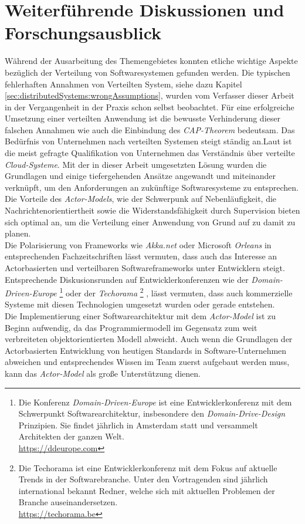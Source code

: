 \section{Weiterführende Diskussionen und Forschungsausblick}
Während der Ausarbeitung des Themengebietes konnten etliche wichtige Aspekte bezüglich der Verteilung von Softwaresystemen gefunden werden. Die typischen fehlerhaften Annahmen von Verteilten System, siehe dazu Kapitel \ref{sec:distributedSystems:wrongAssumptions}, wurden vom Verfasser dieser Arbeit in der Vergangenheit in der Praxis schon selbst beobachtet. Für eine erfolgreiche Umsetzung einer verteilten Anwendung ist  die bewusste 
Verhinderung dieser falschen Annahmen wie auch die Einbindung des \textit{CAP-Theorem}  bedeutsam.  
Das Bedürfnis von Unternehmen nach verteilten Systemen steigt ständig an.Laut \cite{theSkillsCompaniesNeedMost} ist die meist gefragte Qualifikation von Unternehmen das Verständnis über verteilte \textit{Cloud-Systeme}. Mit der in dieser Arbeit umgesetzten Lösung wurden die Grundlagen und einige tiefergehenden Ansätze angewandt und miteinander verknüpft, um den Anforderungen an zukünftige Softwaresysteme zu entsprechen. Die Vorteile des \textit{Actor-Models}, wie der Schwerpunk auf Nebenläufigkeit, die Nachrichtenorientiertheit sowie die Widerstandsfähigkeit durch Supervision bieten sich optimal an, um die Verteilung einer Anwendung von Grund auf zu damit zu planen. \\
Die Polarisierung von Frameworks wie \textit{Akka.net} oder Microsoft \textit{Orleans} in entsprechenden Fachzeitschriften lässt vermuten, dass auch das Interesse an Actorbasierten und verteilbaren Softwareframeworks unter Entwicklern steigt. Entsprechende Diskusionsrunden auf Entwicklerkonferenzen wie der \textit{Domain-Driven-Europe}
\footnote{Die Konferenz \textit{Domain-Driven-Europe} ist eine Entwicklerkonferenz mit dem Schwerpunkt Softwarearchitektur, insbesondere den \textit{Domain-Drive-Design} Prinzipien. Sie findet jährlich in Amsterdam statt und versammelt Architekten der ganzen Welt. \\ \url{https://ddeurope.com}  }
oder der \textit{Techorama}
\footnote{Die Techorama ist eine Entwicklerkonferenz mit dem Fokus auf aktuelle Trends in der Softwarebranche. Unter den Vortragenden sind jährlich international bekannt Redner, welche sich mit aktuellen Problemen der Branche auseinandersetzen. \\ \url{https://techorama.be} }
, lässt vermuten, dass auch kommerzielle Systeme mit diesen Technologien umgesetzt wurden oder gerade entstehen. \\
Die Implementierung einer Softwarearchitektur mit dem \textit{Actor-Model} ist zu Beginn aufwendig, da das Programmiermodell im Gegensatz zum weit verbreiteten objektorientierten Modell abweicht. 
Auch wenn die Grundlagen der Actorbasierten Entwicklung von heutigen Standards in Software-Unternehmen abweichen und entsprechendes Wissen im Team zuerst aufgebaut werden muss, kann das \textit{Actor-Model} als große Unterstützung dienen.   
